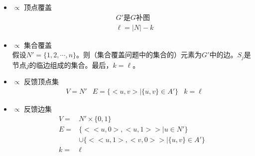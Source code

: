 \documentclass[twocolumn]{article}
\theoremstyle{nonumberplain}%
\begin{document}
\begin{CJK}{UTF8}{gbsn}
\begin{itemize}
    \item { $\propto$ 顶点覆盖}
        \begin{equation}\nonumber %
        \begin{aligned}
        & G' \text{是}G\text{补图}\\
        & \ell=|N|-k
        \end{aligned}
        \end{equation}

    \item { $\propto$ 集合覆盖}\\

        假设$N'=\{1,2,\cdots,n\}$。则（集合覆盖问题中的集合的）元素为$G'$中的边。$S_j$是节点$j$的临边组成的集合。最后，$k=\ell$。

    \item { $\propto$ 反馈顶点集}
        \begin{equation}\nonumber %
        \begin{aligned}
        & V=N'
        & E=\{<u,v>|\{u,v\}\in A'\}
        & k=\ell
        \end{aligned}
        \end{equation}

    \item { $\propto$ 反馈边集}
        \begin{equation}\nonumber %
        \begin{aligned}
        V=&N'\times\{0,1\}\\
        E=&\{<<u,0>,<u,1>>|u\in N'\}\\
          &\cup\{<<u,1>,<v,0>>|\{u,v\}\in A'\}\\
        k=&\ell
        \end{aligned}
        \end{equation}


\end{itemize}
\end{CJK}
\end{document}
